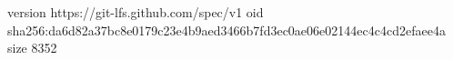 version https://git-lfs.github.com/spec/v1
oid sha256:da6d82a37bc8e0179c23e4b9aed3466b7fd3ec0ae06e02144ec4c4cd2efaee4a
size 8352
